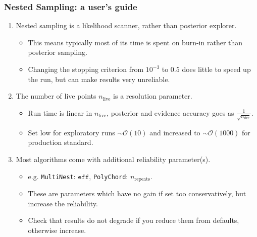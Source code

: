 \documentclass[aspectratio=169]{beamer}
\begin{document}
\begin{frame}
    \frametitle{Nested Sampling: a user's guide}
    \begin{enumerate}
        \item Nested sampling is a likelihood scanner, rather than posterior explorer.
            \begin{itemize}
                \item This means typically most of its time is spent on burn-in rather than posterior sampling.
                \item Changing the stopping criterion from $10^{-3}$ to $0.5$ does little to speed up the run, but can make results very unreliable.
            \end{itemize}
        \item The number of live points $n_\mathrm{live}$ is a resolution parameter.
            \begin{itemize}
                \item Run time is linear in $n_\mathrm{live}$, posterior and evidence accuracy goes as $\frac{1}{\sqrt{n_\mathrm{live}}}$.
                \item Set low for exploratory runs $\sim\mathcal{O}(10)$ and increased to $\sim\mathcal{O}(1000)$ for production standard.
            \end{itemize}
        \item Most algorithms come with additional reliability parameter(s).
            \begin{itemize}
                \item e.g. \texttt{MultiNest}: $\texttt{eff}$, \texttt{PolyChord}: $n_\mathrm{repeats}$.
                \item These are parameters which have no gain if set too conservatively, but increase the reliability.
                \item Check that results do not degrade if you reduce them from defaults, otherwise increase.
            \end{itemize}
    \end{enumerate}
\end{frame}
\end{document}
